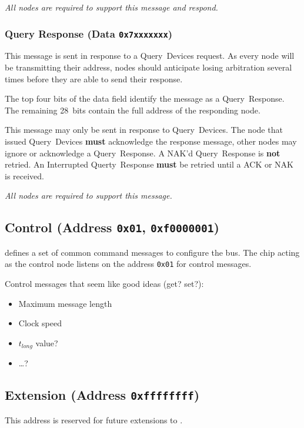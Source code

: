 \medskip
\noindent
\textit{All nodes are required to support this message and respond.}

\subsubsection{Query Response (Data \texttt{0x7xxxxxxx})}
This message is sent in response to a Query~Devices request. As every node
will be transmitting their address, nodes should anticipate losing arbitration
several times before they are able to send their response.

The top four bits of the data field identify the message as a Query~Response.
The remaining 28~bits contain the full address of the responding node.

This message may only be sent in response to Query~Devices. The node that
issued Query~Devices \textbf{must} acknowledge the response message, other
nodes may ignore or acknowledge a Query~Response. A NAK'd Query~Response is
\textbf{not} retried. An Interrupted Querty~Response \textbf{must} be retried
until a ACK or NAK is received.

\medskip
\noindent
\textit{All nodes are required to support this message.}

\subsection{Control (Address \texttt{0x01}, \texttt{0xf0000001})}
\label{sec:control-control}
\bus defines a set of common command messages to configure the bus. The chip
acting as the control node listens on the address {\tt 0x01} for \bus control
messages.

Control messages that seem like good ideas (get? set?):
\begin{itemize}
  \item Maximum message length
  \item Clock speed
  \item $t_{long}$ value?
  \item \ldots?
\end{itemize}

\subsection{Extension (Address \texttt{0xffffffff})}
This address is reserved for future extensions to \bus.

